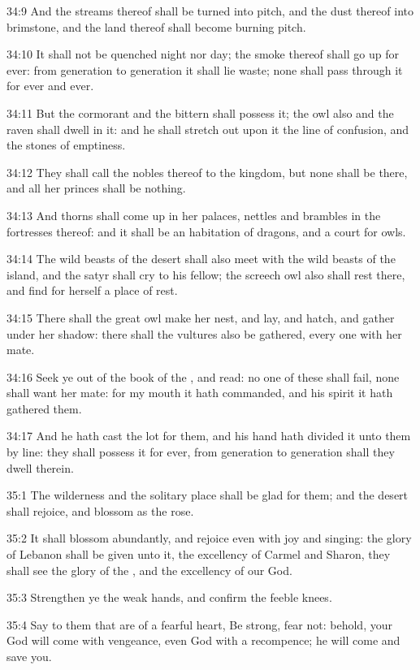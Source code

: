 34:9 And the streams thereof shall be turned into pitch, and the dust
thereof into brimstone, and the land thereof shall become burning
pitch.

34:10 It shall not be quenched night nor day; the smoke thereof shall
go up for ever: from generation to generation it shall lie waste; none
shall pass through it for ever and ever.

34:11 But the cormorant and the bittern shall possess it; the owl also
and the raven shall dwell in it: and he shall stretch out upon it the
line of confusion, and the stones of emptiness.

34:12 They shall call the nobles thereof to the kingdom, but none
shall be there, and all her princes shall be nothing.

34:13 And thorns shall come up in her palaces, nettles and brambles in
the fortresses thereof: and it shall be an habitation of dragons, and
a court for owls.

34:14 The wild beasts of the desert shall also meet with the wild
beasts of the island, and the satyr shall cry to his fellow; the
screech owl also shall rest there, and find for herself a place of
rest.

34:15 There shall the great owl make her nest, and lay, and hatch, and
gather under her shadow: there shall the vultures also be gathered,
every one with her mate.

34:16 Seek ye out of the book of the \LORD, and read: no one of these
shall fail, none shall want her mate: for my mouth it hath commanded,
and his spirit it hath gathered them.

34:17 And he hath cast the lot for them, and his hand hath divided it
unto them by line: they shall possess it for ever, from generation to
generation shall they dwell therein.

35:1 The wilderness and the solitary place shall be glad for them; and
the desert shall rejoice, and blossom as the rose.

35:2 It shall blossom abundantly, and rejoice even with joy and
singing: the glory of Lebanon shall be given unto it, the excellency
of Carmel and Sharon, they shall see the glory of the \LORD, and the
excellency of our God.

35:3 Strengthen ye the weak hands, and confirm the feeble knees.

35:4 Say to them that are of a fearful heart, Be strong, fear not:
behold, your God will come with vengeance, even God with a recompence;
he will come and save you.

